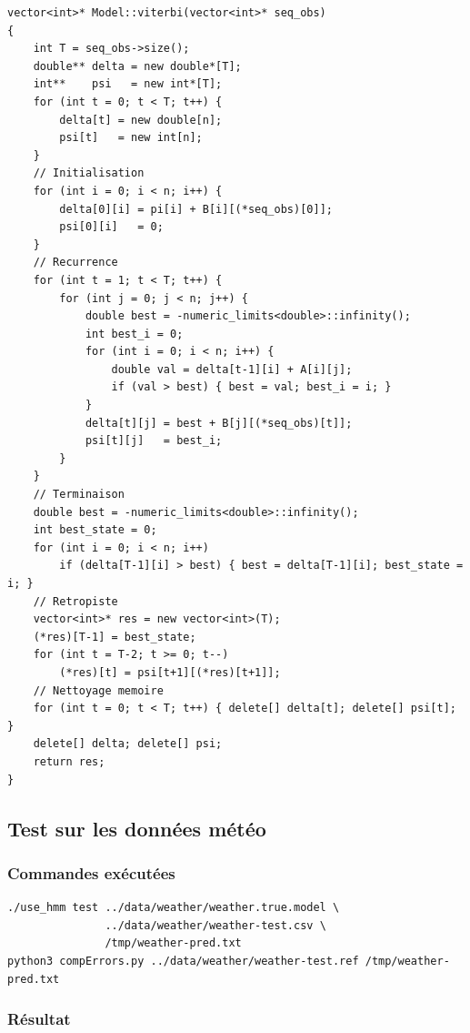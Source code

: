 \documentclass[12pt,a4paper]{article}
\begin{document}
\begin{lstlisting}[style=cppstyle, caption={Algorithme de Viterbi --- \texttt{model.cpp}}]
vector<int>* Model::viterbi(vector<int>* seq_obs)
{
    int T = seq_obs->size();
    double** delta = new double*[T];
    int**    psi   = new int*[T];
    for (int t = 0; t < T; t++) {
        delta[t] = new double[n];
        psi[t]   = new int[n];
    }
    // Initialisation
    for (int i = 0; i < n; i++) {
        delta[0][i] = pi[i] + B[i][(*seq_obs)[0]];
        psi[0][i]   = 0;
    }
    // Recurrence
    for (int t = 1; t < T; t++) {
        for (int j = 0; j < n; j++) {
            double best = -numeric_limits<double>::infinity();
            int best_i = 0;
            for (int i = 0; i < n; i++) {
                double val = delta[t-1][i] + A[i][j];
                if (val > best) { best = val; best_i = i; }
            }
            delta[t][j] = best + B[j][(*seq_obs)[t]];
            psi[t][j]   = best_i;
        }
    }
    // Terminaison
    double best = -numeric_limits<double>::infinity();
    int best_state = 0;
    for (int i = 0; i < n; i++)
        if (delta[T-1][i] > best) { best = delta[T-1][i]; best_state = i; }
    // Retropiste
    vector<int>* res = new vector<int>(T);
    (*res)[T-1] = best_state;
    for (int t = T-2; t >= 0; t--)
        (*res)[t] = psi[t+1][(*res)[t+1]];
    // Nettoyage memoire
    for (int t = 0; t < T; t++) { delete[] delta[t]; delete[] psi[t]; }
    delete[] delta; delete[] psi;
    return res;
}
\end{lstlisting}

\subsection{Test sur les données météo}

\subsubsection*{Commandes exécutées}

\begin{lstlisting}[style=bashstyle]
./use_hmm test ../data/weather/weather.true.model \
               ../data/weather/weather-test.csv \
               /tmp/weather-pred.txt
python3 compErrors.py ../data/weather/weather-test.ref /tmp/weather-pred.txt
\end{lstlisting}

\subsubsection*{Résultat}
\end{document}

